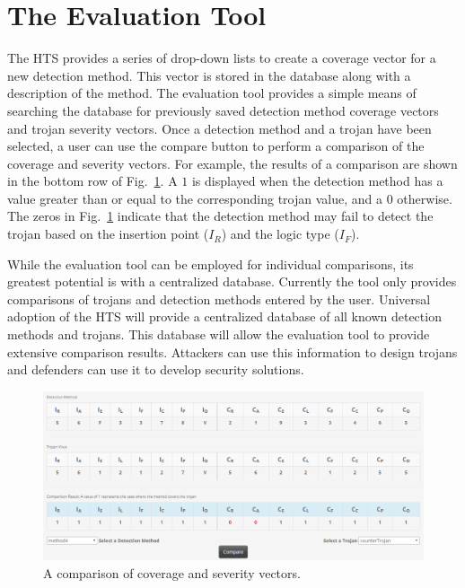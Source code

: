 \section{The Evaluation Tool} \label{sec:toolDetection}
The HTS provides a series of drop-down lists to create a coverage vector for a new detection method.
This vector is stored in the database along with a description of the method.
The evaluation tool provides a simple means of searching the database for previously saved detection method coverage vectors and trojan severity vectors.
Once a detection method and a trojan have been selected, a user can use the compare button to perform a comparison of the coverage and severity vectors.
For example, the results of a comparison are shown in the bottom row of Fig.~\ref{fig:comparison}.
A $1$ is displayed when the detection method has a value greater than or equal to the corresponding trojan value, and a $0$ otherwise.
The zeros in Fig.~\ref{fig:comparison} indicate that the detection method may fail to detect
the trojan based on the insertion point (\textit{$I_R$}) and the logic type (\textit{$I_F$}).

While the evaluation tool can be employed for individual comparisons, its greatest potential is with a centralized database.
Currently the tool only provides comparisons of trojans and detection methods entered by the user.
Universal adoption of the HTS will provide a centralized database of all known detection methods and trojans.
This database will allow the evaluation tool to provide extensive comparison results.
Attackers can use this information to design trojans and defenders can use it to develop security solutions.
\begin{figure}[]
	\centering
	\includegraphics[width=1\linewidth]{figures/comparison}
	\caption{A comparison of coverage and severity vectors.}
	\label{fig:comparison}
\end{figure}

